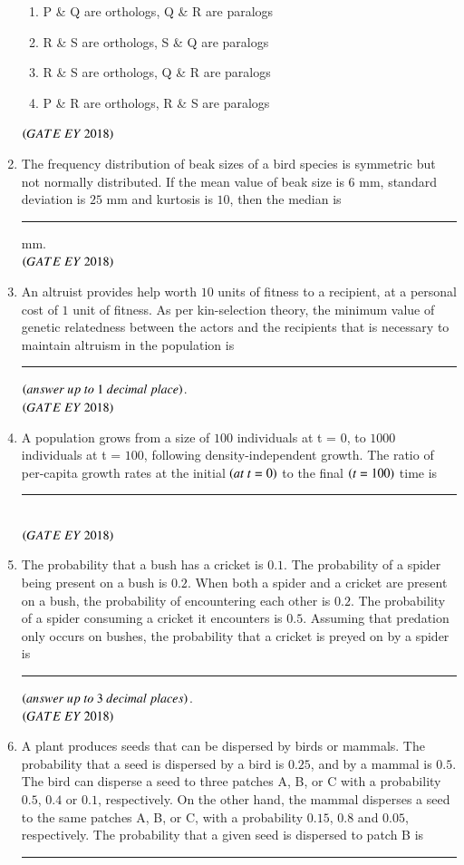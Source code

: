 \documentclass[journal]{IEEEtran}
\numberwithin{equation}{enumi}
\numberwithin{figure}{enumi}
\begin{document}
\begin{enumerate}
\begin{enumerate}
        \item P \& Q are orthologs, Q \& R are paralogs
        \item R \& S are orthologs, S \& Q are paralogs
        \item R \& S are orthologs, Q \& R are paralogs
        \item P \& R are orthologs, R \& S are paralogs
    \end{enumerate}
    \hfill{$\brak{ GATE\ EY\ 2018}$}
    \bigskip
\item The frequency distribution of beak sizes of a bird species is symmetric but not
normally distributed. If the mean value of beak size is $6$ mm, standard deviation is
$25$ mm and kurtosis is $10$, then the median is\rule{3cm}{0.15mm} mm.\\
   
    \hfill{$\brak{ GATE\ EY\ 2018}$}
    \bigskip
\item An altruist provides help worth $10$ units of fitness to a recipient, at a personal cost of
$1$ unit of fitness. As per kin-selection theory, the minimum value of genetic
relatedness between the actors and the recipients that is necessary to maintain
altruism in the population is\rule{3cm}{0.15mm} $\brak{answer\ up\ to\ 1\ decimal\ place}$.\\
   
    \hfill{$\brak{ GATE\ EY\ 2018}$}
    \bigskip
   \item A population grows from a size of $100$ individuals at t = $0$, to $1000$ individuals at
t = $100$, following density-independent growth. The ratio of per-capita growth rates
at the initial $\left(at\ t=0\right)$ to the final $\left(t=100\right)$ time is\rule{3cm}{0.15mm}\\
   
    \hfill{$\brak{ GATE\ EY\ 2018}$}
    \bigskip
\item The probability that a bush has a cricket is $0.1$. The probability of a spider being
present on a bush is $0.2$. When both a spider and a cricket are present on a bush, the
probability of encountering each other is $0.2$. The probability of a spider consuming
a cricket it encounters is $0.5$. Assuming that predation only occurs on bushes, the
probability that a cricket is preyed on by a spider is\rule{3cm}{0.15mm}
$\brak{answer\ up\ to\ 3\ decimal\ places}$.\\
   
    \hfill{$\brak{ GATE\ EY\ 2018}$}
    \bigskip
\item A plant produces seeds that can be dispersed by birds or mammals. The probability
that a seed is dispersed by a bird is $0.25$, and by a mammal is $0.5$. The bird can
disperse a seed to three patches A, B, or C with a probability $0.5$, $0.4$ or $0.1$,
respectively. On the other hand, the mammal disperses a seed to the same patches
A, B, or C, with a probability $0.15$, $0.8$ and $0.05$, respectively. The probability that a
given seed is dispersed to patch B is\rule{3cm}{0.15mm}


\end{enumerate}
\end{document}
